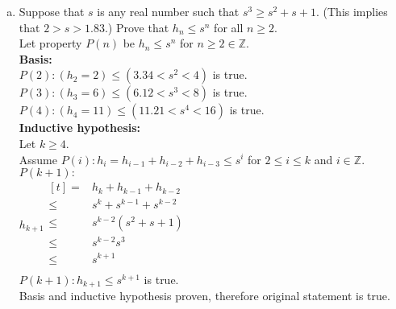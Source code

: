 \documentclass[letterpaper,fleqn,leqno]{article}
\begin{document}
\begin{enumerate}[(a)]
{\begin{enumerate}[(a)]
				\item
				Suppose that $s$ is any real number such that $s^3\geq s^2+s+1$. (This implies that $2>s>1.83$.) Prove that $h_n\leq s^n$ for all $n\geq2$. \\
				Let property $P(n)$ be $h_n\leq s^n$ for $n\geq2\in\mathbb{Z}$. \\
				\textbf{Basis:} \\
				$P(2): (h_2=2)\leq(3.34<s^2<4)$ is true. \\
				$P(3): (h_3=6)\leq(6.12<s^3<8)$ is true. \\
				$P(4): (h_4=11)\leq(11.21<s^4<16)$ is true. \\
				\textbf{Inductive hypothesis:} \\
				Let $k\geq4$. \\
				Assume $P(i): h_i=h_{i-1}+h_{i-2}+h_{i-3}\leq s^i$ for $2\leq i\leq k$ and $i\in\mathbb{Z}$. \\
				$P(k+1):$ \\
				$h_{k+1}\begin{aligned}[t]
					= & h_k+h_{k-1}+h_{k-2} \\
					\leq & s^k+s^{k-1}+s^{k-2} \\
					\leq & s^{k-2}\left(s^2+s+1\right) \\
					\leq & s^{k-2}s^3 \\
					\leq & s^{k+1} \\
				\end{aligned}$ \\
				$P(k+1):h_{k+1}\leq s^{k+1}$ is true. \\
				Basis and inductive hypothesis proven, therefore original statement is true. \\
			\end{enumerate}
		}
\end{enumerate}
\end{document}
